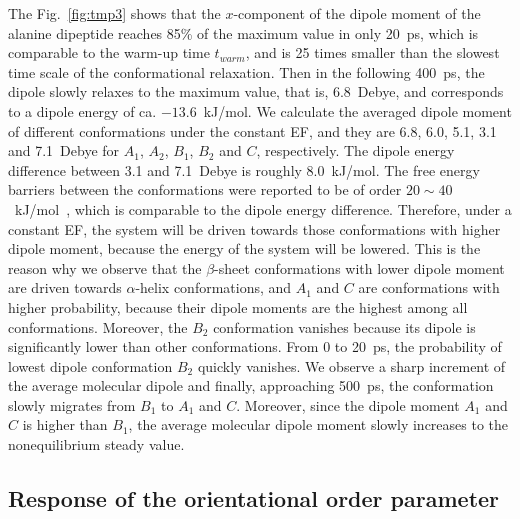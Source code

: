 \documentclass[a4paper,preprint,unsortedaddress,onecolumn]{revtex4-1}
\begin{document}
The Fig.~\ref{fig:tmp3}
shows that the $x$-component of the dipole moment of the alanine dipeptide
reaches 85\% of the maximum value in only 20~ps, which is comparable to
the warm-up time $t_{warm}$, and is 25 times
smaller than the slowest time scale of the conformational relaxation.
Then in the following 400~ps, the dipole slowly relaxes to the 
maximum value, that is, 
6.8~Debye, and  corresponds to a dipole energy of ca. $-13.6$~kJ/mol.
We calculate the averaged dipole moment of different conformations
under the constant EF, and they are 6.8, 6.0, 5.1, 3.1 and 7.1~Debye
for $A_1$, $A_2$, $B_1$, $B_2$ and $C$, respectively.
The dipole energy difference between 3.1 and 7.1~Debye is roughly 8.0~kJ/mol.
The free energy barriers between the
conformations were reported to be of order $20\sim 40$~kJ/mol~\cite{bohner2012algorithm},
which is comparable to the dipole energy difference. 
Therefore, under a constant EF, the system will be driven towards those
conformations with higher dipole moment, because the
energy of the system will be lowered.  This is the reason why
we observe that the $\beta$-sheet conformations with lower dipole moment
are driven towards $\alpha$-helix conformations, 
and $A_1$ and $C$ are conformations with higher probability, because their dipole moments are the highest
among all conformations. Moreover, the $B_2$ conformation vanishes because
its dipole is significantly lower than other conformations.
From 0 to 20~ps, the probability of
lowest dipole conformation $B_2$ quickly
vanishes. We observe a sharp increment of the average molecular dipole and finally, approaching  500~ps, the conformation slowly migrates from
$B_1$ to $A_1$ and $C$. Moreover, since the dipole moment $A_1$ and $C$
is higher than $B_1$, the average molecular dipole moment slowly increases
to the nonequilibrium steady value.
\subsection{Response of the orientational order parameter}
\end{document}
